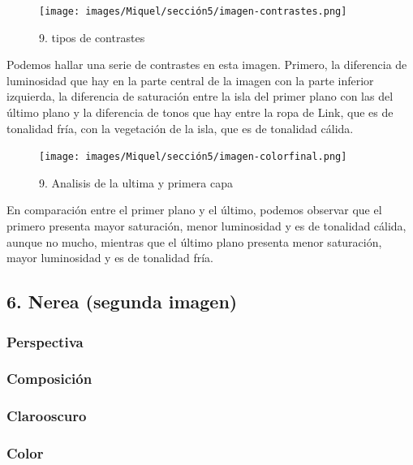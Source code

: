 \documentclass[12pt]{article}
\begin{document}
\begin{figure}[H]
      \centering
      \texttt{[image: images/Miquel/sección5/imagen-contrastes.png]}
      \caption{\small 9. tipos de contrastes}
    \end{figure}
    
    Podemos hallar una serie de contrastes en esta imagen. Primero, la diferencia de luminosidad que hay en la parte central de la imagen con la parte inferior izquierda, la diferencia de saturación entre  la isla del primer plano con las del último plano y la diferencia de tonos que hay entre la ropa de Link, que es de tonalidad fría, con la vegetación de la isla, que es de tonalidad cálida.

    \begin{figure}[H]
      \centering
      \texttt{[image: images/Miquel/sección5/imagen-colorfinal.png]}
      \caption{\small 9. Analisis de la ultima y primera capa}
    \end{figure}

    En comparación entre el primer plano y el último, podemos observar que el primero presenta mayor saturación, menor luminosidad y es de tonalidad cálida, aunque no mucho, mientras que el último plano presenta menor saturación, mayor luminosidad y es de tonalidad fría.


    \subsection{6. Nerea (segunda imagen)}
        \subsubsection{Perspectiva}

        \subsubsection{Composición}

        \subsubsection{Clarooscuro}

        \subsubsection{Color}
        \newpage
\end{document}
